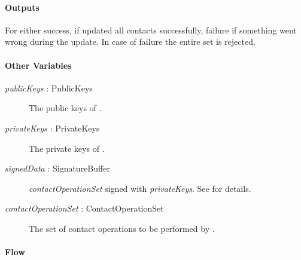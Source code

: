 \documentclass[a4paper,10pt]{article}
\newcommand{\signedData}{\emph{signedData}}
\newcommand{\privateKeys}{\emph{privateKeys}}
\newcommand{\publicKeys}{\emph{publicKeys}}
\newcommand{\contactOperationSet}{\emph{contactOperationSet}}
\begin{document}
\paragraph{Outputs}
For  either success, if \Server{} updated all contacts successfully, failure if something went wrong during the update. In case of failure the entire set is rejected.

\paragraph{Other Variables}
\SpecialItem
\begin{description}
 \item[\publicKeys{} : PublicKeys] The public keys of .
 \item[\privateKeys{} : PrivateKeys] The private keys of .
 \item[\signedData{} : SignatureBuffer] \contactOperationSet{} signed with \privateKeys{}. See \cite{crypto_spec} for details.
 \item[\contactOperationSet{} : ContactOperationSet] The set of contact operations to be performed by \Server{}.
\end{description}

\paragraph{Flow}
\end{document}
